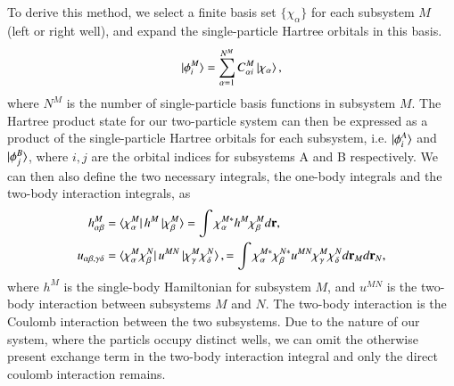 \documentclass{subfiles}
\begin{document}
\\ \\
To derive this method, we select a finite basis set $\{\chi_\alpha\}$ for each subsystem $M$ (left or right well), and expand the single-particle Hartree orbitals in this basis. 
\begin{align*}
    \ket{\phi^M_i} = \sum_{\alpha=1}^{N^M} C^M_{\alpha i}\ket{\chi_\alpha},
\end{align*}
where $N^M$ is the number of single-particle basis functions in subsystem $M$. The Hartree product state for our two-particle system can then be expressed as a product of the single-particle Hartree orbitals for each subsystem, i.e. $\ket{\phi^A_i}$ and $\ket{\phi^B_j}$, where $i,j$ are the orbital indices for subsystems A and B respectively. We can then also define the two necessary integrals, the one-body integrals and the two-body interaction integrals, as
\begin{align*}
    h_{\alpha\beta}^M &= \bra{\chi_\alpha^M}h^M\ket{\chi_\beta^M} = \int \chi_\alpha^{M*} h^M\chi_\beta^M d\mathbf{r},\\
    u_{\alpha\beta,\gamma\delta} &= \bra{\chi_\alpha^M\chi_\beta^N}u^{MN}\ket{\chi_\gamma^M\chi_\delta^N}, = \int \chi_\alpha^{M*}\chi_\beta^{N*} u^{MN} \chi_\gamma^M\chi_\delta^N d\mathbf{r}_M d\mathbf{r}_N,
\end{align*}
where $h^M$ is the single-body Hamiltonian for subsystem $M$, and $u^{MN}$ is the two-body interaction between subsystems $M$ and $N$. The two-body interaction is the Coulomb interaction between the two subsystems. Due to the nature of our system, where the particls occupy distinct wells, we can omit the otherwise present exchange term in the two-body interaction integral and only the direct coulomb interaction remains. \\
\end{document}
